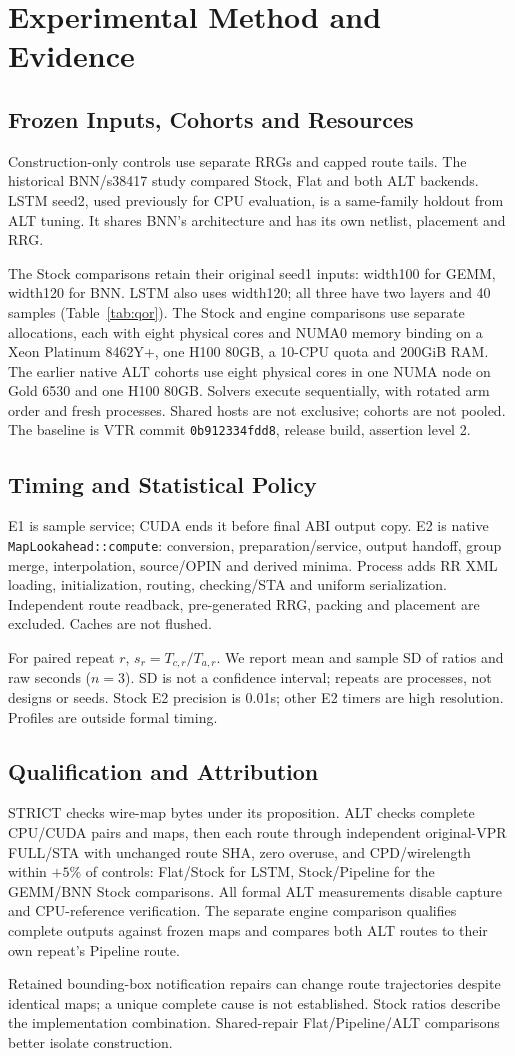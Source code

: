 \section{Experimental Method and Evidence}
\subsection{Frozen Inputs, Cohorts and Resources}
Construction-only controls use separate RRGs and capped route tails. The historical BNN/s38417 study compared Stock, Flat and both ALT backends. LSTM seed2, used previously for CPU evaluation, is a same-family holdout from ALT tuning. It shares BNN's architecture and has its own netlist, placement and RRG.

The Stock comparisons retain their original seed1 inputs: width100 for GEMM, width120 for BNN. LSTM also uses width120; all three have two layers and 40 samples (Table~\ref{tab:qor}). The Stock and engine comparisons use separate allocations, each with eight physical cores and NUMA0 memory binding on a Xeon Platinum 8462Y+, one H100 80GB, a 10-CPU quota and 200GiB RAM. The earlier native ALT cohorts use eight physical cores in one NUMA node on Gold 6530 and one H100 80GB. Solvers execute sequentially, with rotated arm order and fresh processes. Shared hosts are not exclusive; cohorts are not pooled. The baseline is VTR commit \texttt{0b912334fdd8}, release build, assertion level 2.

\subsection{Timing and Statistical Policy}
E1 is sample service; CUDA ends it before final ABI output copy. E2 is native \texttt{MapLookahead::compute}: conversion, preparation/service, output handoff, group merge, interpolation, source/OPIN and derived minima. Process adds RR XML loading, initialization, routing, checking/STA and uniform serialization. Independent route readback, pre-generated RRG, packing and placement are excluded. Caches are not flushed.

For paired repeat $r$, $s_r=T_{c,r}/T_{a,r}$. We report mean and sample SD of ratios and raw seconds ($n=3$). SD is not a confidence interval; repeats are processes, not designs or seeds. Stock E2 precision is 0.01s; other E2 timers are high resolution. Profiles are outside formal timing.

\subsection{Qualification and Attribution}
STRICT checks wire-map bytes under its proposition. ALT checks complete CPU/CUDA pairs and maps, then each route through independent original-VPR FULL/STA with unchanged route SHA, zero overuse, and CPD/wirelength within $+5\%$ of controls: Flat/Stock for LSTM, Stock/Pipeline for the GEMM/BNN Stock comparisons. All formal ALT measurements disable capture and CPU-reference verification. The separate engine comparison qualifies complete outputs against frozen maps and compares both ALT routes to their own repeat's Pipeline route.

Retained bounding-box notification repairs can change route trajectories despite identical maps; a unique complete cause is not established. Stock ratios describe the implementation combination. Shared-repair Flat/Pipeline/ALT comparisons better isolate construction.
